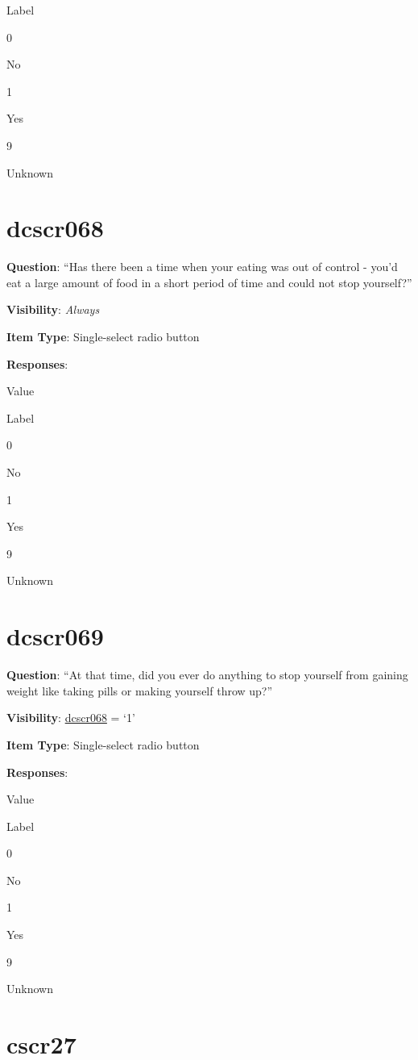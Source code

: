 \documentclass[]{book}
\begin{document}
Label

0

No

1

Yes

9

Unknown

\hypertarget{dcscr068}{%
\section{dcscr068}\label{dcscr068}}

\textbf{Question}: ``Has there been a time when your eating was out of control - you'd eat a large amount of food in a short period of time and could not stop yourself?''

\textbf{Visibility}: \emph{Always}

\textbf{Item Type}: Single-select radio button

\textbf{Responses}:

Value

Label

0

No

1

Yes

9

Unknown

\hypertarget{dcscr069}{%
\section{dcscr069}\label{dcscr069}}

\textbf{Question}: ``At that time, did you ever do anything to stop yourself from gaining weight like taking pills or making yourself throw up?''

\textbf{Visibility}: \protect\hyperlink{dcscr068}{dcscr068} = `1'

\textbf{Item Type}: Single-select radio button

\textbf{Responses}:

Value

Label

0

No

1

Yes

9

Unknown

\hypertarget{cscr27}{%
\section{cscr27}\label{cscr27}}
\end{document}
